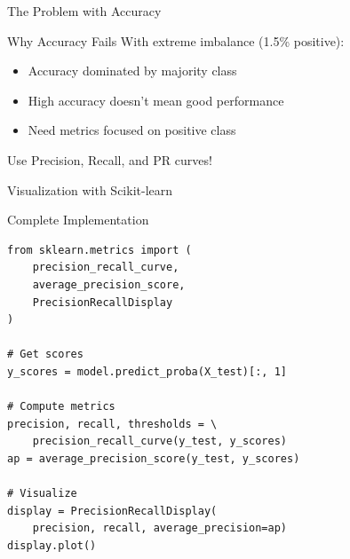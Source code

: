 \documentclass{beamer}
\begin{document}
\begin{frame}{The Problem with Accuracy}
\begin{keypointsbox}{Why Accuracy Fails}
\small
With extreme imbalance (1.5\% positive):
\begin{itemize}
    \item Accuracy dominated by majority class
    \item High accuracy doesn't mean good performance
    \item Need metrics focused on positive class
\end{itemize}
\end{keypointsbox}

\vspace{0.15cm}

\begin{center}
\Large
Use Precision, Recall, and PR curves!
\end{center}
\end{frame}

\begin{frame}[fragile]{Visualization with Scikit-learn}
\begin{block}{Complete Implementation}
\small
\begin{verbatim}
from sklearn.metrics import (
    precision_recall_curve,
    average_precision_score,
    PrecisionRecallDisplay
)

# Get scores
y_scores = model.predict_proba(X_test)[:, 1]

# Compute metrics
precision, recall, thresholds = \
    precision_recall_curve(y_test, y_scores)
ap = average_precision_score(y_test, y_scores)

# Visualize
display = PrecisionRecallDisplay(
    precision, recall, average_precision=ap)
display.plot()
\end{verbatim}
\end{block}
\end{frame}

\end{document}
